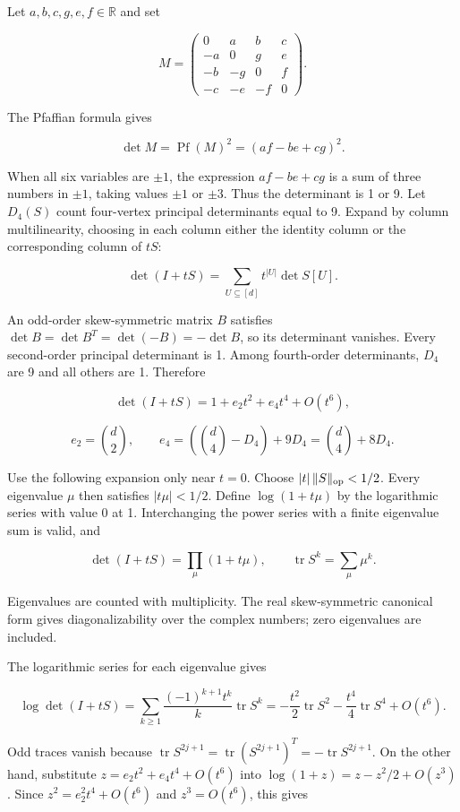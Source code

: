 \documentclass[11pt,a4paper]{article}
\begin{document}
Let \(a,b,c,g,e,f\in\mathbb R\) and set

\[
M=\begin{pmatrix}
0&a&b&c\\
-a&0&g&e\\
-b&-g&0&f\\
-c&-e&-f&0
\end{pmatrix}.
\]

The Pfaffian formula gives

\[
\det M=\operatorname{Pf}(M)^2=(af-be+cg)^2.
\]

When all six variables are \(\pm1\), the expression \(af-be+cg\) is a sum of three numbers in \(\pm1\), taking values \(\pm1\) or \(\pm3\). Thus the determinant is 1 or 9. Let \(D_4(S)\) count four-vertex principal determinants equal to 9. Expand by column multilinearity, choosing in each column either the identity column or the corresponding column of \(tS\):

\[
\det(I+tS)=\sum_{U\subseteq[d]}t^{|U|}\det S[U].
\]

An odd-order skew-symmetric matrix \(B\) satisfies \(\det B=\det B^T=\det(-B)=-\det B\), so its determinant vanishes. Every second-order principal determinant is 1. Among fourth-order determinants, \(D_4\) are 9 and all others are 1. Therefore

\[
\det(I+tS)=1+e_2t^2+e_4t^4+O(t^6),
\]

\[
e_2=\binom d2,\qquad
e_4=(\binom d4-D_4)+9D_4=\binom d4+8D_4.
\]

Use the following expansion only near \(t=0\). Choose \(|t|\,\|S\|_{\rm op}<1/2\). Every eigenvalue \(\mu\) then satisfies \(|t\mu|<1/2\). Define \(\log(1+t\mu)\) by the logarithmic series with value 0 at 1. Interchanging the power series with a finite eigenvalue sum is valid, and

\[
\det(I+tS)=\prod_\mu(1+t\mu),\qquad
\operatorname{tr}S^k=\sum_\mu\mu^k.
\]

Eigenvalues are counted with multiplicity. The real skew-symmetric canonical form gives diagonalizability over the complex numbers; zero eigenvalues are included.

The logarithmic series for each eigenvalue gives

\[
\log\det(I+tS)
=\sum_{k\ge1}\frac{(-1)^{k+1}t^k}{k}\operatorname{tr}S^k
=-\frac{t^2}{2}\operatorname{tr}S^2
-\frac{t^4}{4}\operatorname{tr}S^4+O(t^6).
\]

Odd traces vanish because \(\operatorname{tr}S^{2j+1}=\operatorname{tr}(S^{2j+1})^T=-\operatorname{tr}S^{2j+1}\). On the other hand, substitute \(z=e_2t^2+e_4t^4+O(t^6)\) into \(\log(1+z)=z-z^2/2+O(z^3)\). Since \(z^2=e_2^2t^4+O(t^6)\) and \(z^3=O(t^6)\), this gives
\end{document}
